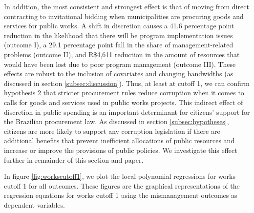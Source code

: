 \documentclass[11pt]{article}
\begin{document}
In addition, the most consistent and strongest effect is that of moving from direct contracting to invitational bidding when municipalities are procuring goods and services for public works. A shift in discretion causes a 41.6 percentage point reduction in the likelihood that there will be program implementation issues (outcome I), a 29.1 percentage point fall in the share of management-related problems (outcome II), and R\$4,611 reduction in the amount of resources that would have been lost due to poor program management (outcome III). These effects are robust to the inclusion of covariates and changing bandwidths (as discussed in section \ref{subsec:discussion}). Thus, at least at cutoff 1, we can confirm hypothesis 2 that stricter procurement rules reduce corruption when it comes to calls for goods and services used in public works projects. This indirect effect of discretion in public spending is an important determinant for citizens' support for the Brazilian procurement law. As discussed in section \ref{subsec:hypotheses}, citizens are more likely to support any corruption legislation if there are additional benefits that prevent inefficient allocations of public resources and increase or improve the provisions of public policies. We investigate this effect further in remainder of this section and paper.

 In figure \ref{fig:workscutoff1}, we plot the local polynomial regressions for works cutoff 1 for all outcomes. These figures are the graphical representations of the regression equations for works cutoff 1 using the mismanagement outcomes as dependent variables.
\end{document}
